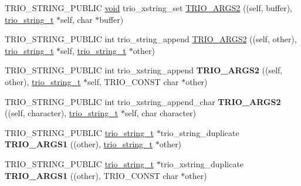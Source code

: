 \begin{DoxyCompactItemize}
\item 
T\+R\+I\+O\+\_\+\+S\+T\+R\+I\+N\+G\+\_\+\+P\+U\+B\+L\+IC \hyperlink{interfacevoid}{void} trio\+\_\+xstring\+\_\+set \hyperlink{group___dynamic_strings_ga85dae323032856f313c671ce62d969d4}{T\+R\+I\+O\+\_\+\+A\+R\+G\+S2} ((self, buffer), \hyperlink{struct__trio__string__t}{trio\+\_\+string\+\_\+t} $\ast$self, char $\ast$buffer)
\item 
T\+R\+I\+O\+\_\+\+S\+T\+R\+I\+N\+G\+\_\+\+P\+U\+B\+L\+IC int trio\+\_\+string\+\_\+append \hyperlink{group___dynamic_strings_gae667c0eb39eed60b4c2742eb2d5cef5b}{T\+R\+I\+O\+\_\+\+A\+R\+G\+S2} ((self, other), \hyperlink{struct__trio__string__t}{trio\+\_\+string\+\_\+t} $\ast$self, \hyperlink{struct__trio__string__t}{trio\+\_\+string\+\_\+t} $\ast$other)
\item 
\mbox{\label{group___dynamic_strings_gafd3b48465dd816508d93f1d1b56b4dcc}} 
T\+R\+I\+O\+\_\+\+S\+T\+R\+I\+N\+G\+\_\+\+P\+U\+B\+L\+IC int trio\+\_\+xstring\+\_\+append {\bfseries T\+R\+I\+O\+\_\+\+A\+R\+G\+S2} ((self, other), \hyperlink{struct__trio__string__t}{trio\+\_\+string\+\_\+t} $\ast$self, T\+R\+I\+O\+\_\+\+C\+O\+N\+ST char $\ast$other)
\item 
\mbox{\label{group___dynamic_strings_ga07775c2e3248fab32f50d4f67100406c}} 
T\+R\+I\+O\+\_\+\+S\+T\+R\+I\+N\+G\+\_\+\+P\+U\+B\+L\+IC int trio\+\_\+xstring\+\_\+append\+\_\+char {\bfseries T\+R\+I\+O\+\_\+\+A\+R\+G\+S2} ((self, character), \hyperlink{struct__trio__string__t}{trio\+\_\+string\+\_\+t} $\ast$self, char character)
\item 
\mbox{\label{group___dynamic_strings_ga0601773a84fb518e796cc5b7b73160ee}} 
T\+R\+I\+O\+\_\+\+S\+T\+R\+I\+N\+G\+\_\+\+P\+U\+B\+L\+IC \hyperlink{struct__trio__string__t}{trio\+\_\+string\+\_\+t} $\ast$trio\+\_\+string\+\_\+duplicate {\bfseries T\+R\+I\+O\+\_\+\+A\+R\+G\+S1} ((other), \hyperlink{struct__trio__string__t}{trio\+\_\+string\+\_\+t} $\ast$other)
\item 
\mbox{\label{group___dynamic_strings_ga89005a6b765842b784abf609bf6995d4}} 
T\+R\+I\+O\+\_\+\+S\+T\+R\+I\+N\+G\+\_\+\+P\+U\+B\+L\+IC \hyperlink{struct__trio__string__t}{trio\+\_\+string\+\_\+t} $\ast$trio\+\_\+xstring\+\_\+duplicate {\bfseries T\+R\+I\+O\+\_\+\+A\+R\+G\+S1} ((other), T\+R\+I\+O\+\_\+\+C\+O\+N\+ST char $\ast$other)

\end{DoxyCompactItemize}
